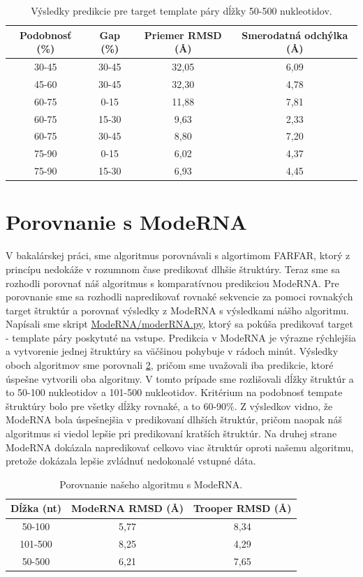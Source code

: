 \begin{table}[b!]
\centering
\begin{tabular}{cccc}
\toprule
Podobnosť (\%) & Gap (\%)  & Priemer RMSD (Å) & Smerodatná odchýlka  (Å)\\
\midrule
30-45  & 30-45 & 32,05 & 6,09 \\
45-60  & 30-45 & 32,30 & 4,78 \\
60-75  &   0-15 & 11,88 & 7,81 \\
60-75  & 15-30 &   9,63 & 2,33 \\
60-75  & 30-45 &   8,80 & 7,20 \\
75-90  &   0-15 &   6,02 & 4,37 \\
75-90  & 15-30 &   6,93 & 4,45 \\
\bottomrule
\end{tabular}
\caption{Výsledky predikcie pre target template páry dĺžky 50-500 nukleotidov. }\label{tab4.1}
\end{table}


\section{Porovnanie s ModeRNA}
V bakalárskej práci, sme algoritmus porovnávali s algortimom FARFAR,  ktorý z princípu nedokáže v rozumnom čase predikovať dlhšie štruktúry. Teraz sme sa rozhodli porovnať náš algoritmus s komparatívnou predikciou ModeRNA. Pre porovnanie sme sa rozhodli napredikovať rovnaké sekvencie za pomoci rovnakých target štruktúr a porovnať  výsledky z ModeRNA s výsledkami nášho algoritmu. Napísali sme skript \url{ModeRNA/moderRNA.py}, ktorý sa pokúša predikovať target - template páry poskytuté na vstupe. Predikcia v ModeRNA je výrazne rýchlejšia a vytvorenie jednej štruktúry sa väčšinou pohybuje v rádoch minút. Výsledky oboch algoritmov sme porovnali \ref{tab4.2}, pričom sme uvažovali iba predikcie, ktoré úspešne vytvorili oba algoritmy. V tomto prípade sme rozlišovali dĺžky štruktúr a to 50-100 nukleotidov a 101-500 nukleotidov. Kritérium na podobnosť tempate štruktúry bolo pre všetky dĺžky rovnaké, a to 60-90\%. Z výsledkov vidno, že ModeRNA bola úspešnejšia v predikovaní dlhších štruktúr, pričom naopak náš algoritmus si viedol lepšie pri predikovaní kratších štruktúr. Na druhej strane ModeRNA dokázala napredikovať celkovo viac štruktúr oproti našemu algoritmu, pretože dokázala lepšie zvládnuť nedokonalé vstupné dáta.

\begin{table}[b!]
\centering
\begin{tabular}{ccc}
\toprule
Dĺžka (nt) & ModeRNA RMSD (Å) & Trooper RMSD (Å) \\
\midrule
50-100    & 5,77 & 8,34  \\
101-500  & 8,25 & 4,29  \\
\bottomrule
50-500  & 6,21 & 7,65  \\
\end{tabular}
\caption{Porovnanie našeho algoritmu s ModeRNA. }\label{tab4.2}
\end{table}

